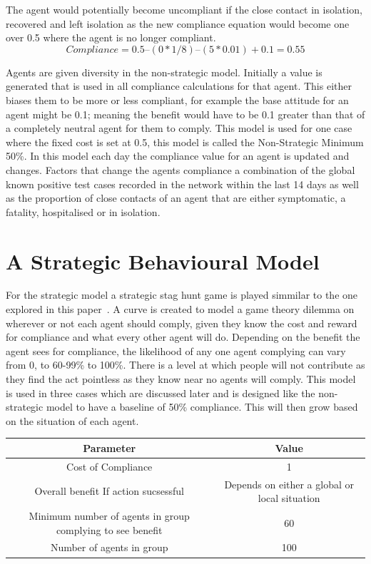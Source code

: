 \documentclass{article}
\begin{document}
The agent would potentially become uncompliant if the close contact in isolation, recovered and left isolation as the new compliance equation would become one over 0.5 where the agent is no longer compliant.
\[Compliance = 0.5 – (0 * 1/8) – (5*0.01) + 0.1 = 0.55\]
\newline





Agents are given diversity in the non-strategic model. Initially a value is generated that is used in all compliance calculations for that agent. This either biases them to be more or less compliant, for example the base attitude for an agent might be 0.1; meaning the benefit would have to be 0.1 greater than that of a completely neutral agent for them to comply. This model is used for one case where the fixed cost is set at 0.5, this model is called the Non-Strategic Minimum 50\%.  In this model each day the compliance value for an agent is updated and changes. Factors that change the agents compliance a combination of the global known positive test cases recorded in the network within the last 14 days as well as the proportion of close contacts of an agent that are either symptomatic, a fatality, hospitalised or in isolation.\newline


\newpage
\section{A Strategic Behavioural Model}
For the strategic model a strategic stag hunt game is played simmilar to the one explored in this paper~\cite{pacheco_santos_souza_2014}.  A curve is created to model a game theory dilemma on wherever or not each agent should comply, given they know the cost and reward for compliance and what every other agent will do. Depending on the benefit the agent sees for compliance, the likelihood of any one agent complying can vary from 0, to 60-99\% to 100\%. There is a level at which people will not contribute as they find the act pointless as they know near no agents will comply. This model is used in three cases which are discussed later and is designed like the non-strategic model to have a baseline of 50\% compliance. This will then grow based on the situation of each agent.\newline

\begin{tabular}{|c|c|}
\hline
Parameter & Value \\ \hline
Cost of Compliance & 1 \\ \hline
Overall benefit If action sucsessful & Depends on either a global or local situation\\ \hline
Minimum number of agents in group complying to see benefit & 60\\ \hline
Number of agents in group & 100\\ \hline
\end{tabular}
\newline
\end{document}
